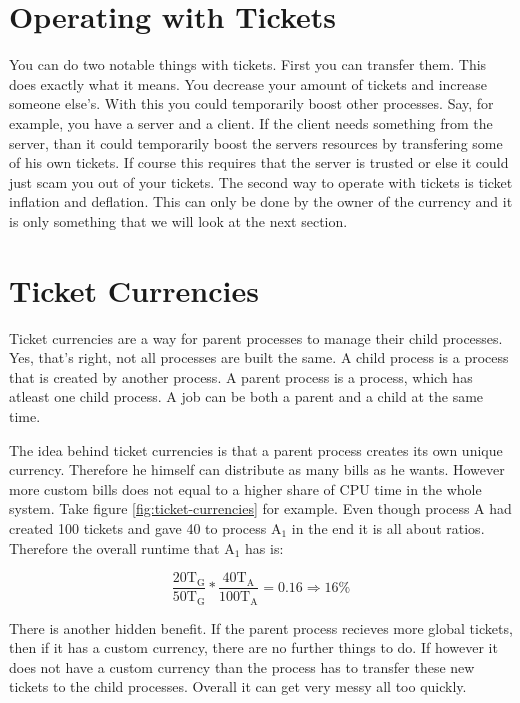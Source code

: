 \section{Operating with Tickets}

You can do two notable things with tickets. First you can transfer them. 
This does exactly what it means. You decrease your amount of tickets and increase someone else's. 
With this you could temporarily boost other processes.
Say, for example, you have a server and a client.
If the client needs something from the server, than it could temporarily boost the servers resources by transfering some of his own tickets.
If course this requires that the server is trusted or else it could just scam you out of your tickets.
The second way to operate with tickets is ticket inflation and deflation. This can only be done by the owner of the currency and it is only something that we will look at the next section.

\section{Ticket Currencies}

Ticket currencies are a way for parent processes to manage their child processes.
Yes, that's right, not all processes are built the same.
A child process is a process that is created by another process.
A parent process is a process, which has atleast one child process.
A job can be both a parent and a child at the same time.

The idea behind ticket currencies is that a parent process creates its own unique currency. Therefore he himself can distribute as many bills as he wants. 
However more custom bills does not equal to a higher share of CPU time in the whole system.
Take figure \ref{fig:ticket-currencies} for example. Even though process A had created 100 tickets and gave 40 to process A$_1$ in the end it is all about ratios.
Therefore the overall runtime that A$_1$ has is: 

$$\frac{20\text{T}_\text{G}}{50\text{T}_\text{G}} * \frac{40\text{T}_\text{A}}{100\text{T}_\text{A}} = 0.16 \Rightarrow 16\%$$

There is another hidden benefit. If the parent process recieves more global tickets, then if it has a custom currency, there are no further things to do.
If however it does not have a custom currency than the process has to transfer these new tickets to the child processes. Overall it can get very messy all too quickly.

